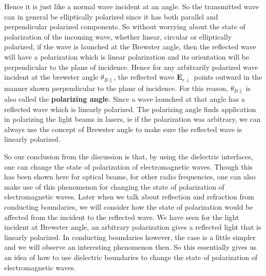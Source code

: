 Hence it is just like a normal wave incident at an angle. So the transmitted wave can in general be elliptically polarized since it has both parallel and perpendicular polarized components.
So without worrying about the state of polarization of the incoming wave, whether linear, circular or elliptically polarized, if the wave is launched at the Brewster angle, then the reflected wave will have a polarization which is linear polarization and its orientation will be perpendicular to the plane of incidence. Hence for any arbitrarily polarized wave incident at the brewster angle $\theta_{B\parallel}$, the reflected wave \textbf{E}$_{r\perp}$ points outward in the manner shown perpendicular to the plane of incidence. For this reason, $\theta_{B\parallel}$ is also called the \textbf{polarizing angle}. Since a wave launched at that angle has a reflected wave which is linearly polarized. The polarizing angle finds application in polarizing the light beams in lasers, ie if the polarization was arbitrary, we can always use the concept of Brewster angle to make sure the reflected wave is linearly polarized. 

So our conclusion from the discussion is that, by using the dielectric interfaces, one can change the state of polarization of electromagnetic waves. Though this has been shown here for optical beams, for other radio frequencies, one can also make use of this phenomenon for changing the state of polarization of electromagnetic waves.
Later when we talk about reflection and refraction from conducting boundaries, we will consider how the state of polarization would be affected from the incident to the reflected wave.  We have seen for the light incident at Brewster angle, an arbitrary polarization gives a reflected light that is linearly polarized. In conducting boundaries however, the case is a little simpler and we will observe an interesting phenomenon then. 
So this essentially gives us an idea of how to use dielectric boundaries to change the state of polarization of electromagnetic waves. 

